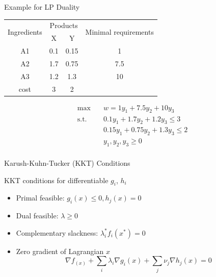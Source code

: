 \documentclass[12pt,notes,mathserif]{beamer}
\begin{document}
\begin{frame}
	{Example for LP Duality}  
	\begin{table}
		\begin{tabular}{cccc}
			\hline
			\multirow{2}{*}{Ingredients} & \multicolumn{2}{c}{Products} & \multirow{2}{*}{Minimal requirements}  \\ \cline{2-3}
				 & X   & Y    &     \\  \hline \hline
			A1   & 0.1 & 0.15 & 1   \\
			A2   & 1.7 & 0.75 & 7.5 \\
			A3   & 1.2 & 1.3  & 10  \\ \hline
			cost & 3   & 2    &     \\ \hline
		\end{tabular}
	\end{table}
\begin{equation*}
	\begin{aligned}
		\max \quad & w= 1 y_1 + 7.5y_2 +10 y_3  \\  
		\textrm{s.t.} \quad & 0.1 y_1 + 1.7 y_2 + 1.2 y_3 \le 3   \\   
		& 0.15y_1 + 0.75 y_2 + 1.3 y_3 \le 2  \\
		& y_1,y_2,y_3 \ge 0  \\
	\end{aligned}
\end{equation*}
\end{frame} 



\begin{frame}
	{Karush-Kuhn-Tucker (KKT) Conditions}  

	\begin{block}{KKT conditions for differentiable $g_i$, $h_i$}
		\begin{itemize}
			\item Primal feasible: $g_i(x) \le 0, h_j(x) =0$ 
			\item Dual feasible: $\lambda \ge 0$ 
			\item Complementary slackness: $\lambda_i^* f_i(x^*) =0$
			\item Zero gradient of Lagrangian \wrt $x$  
				\[\nabla f_(x) + \sum_{i} \lambda_i \nabla g_i(x) + \sum_{j} \nu_j \nabla h_j(x) =0 \]
		\end{itemize}
	\end{block}

\end{frame}
\end{document}
